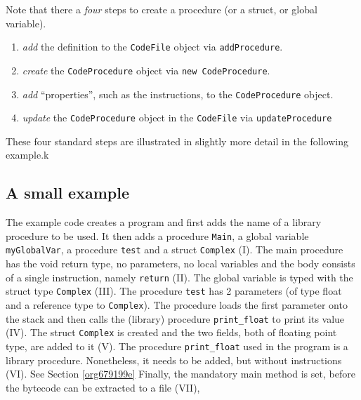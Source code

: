 \documentclass[11pt]{article}
\begin{document}
Note that there a \emph{four} steps to create a procedure (or a struct, or
global variable).

\begin{enumerate}
\item \emph{add} the definition to the \texttt{CodeFile} object via \texttt{addProcedure}.
\item \emph{create} the \texttt{CodeProcedure} object via \texttt{new CodeProcedure}.
\item \emph{add} ``properties'', such as the instructions, to the \texttt{CodeProcedure}
object.
\item \emph{update} the \texttt{CodeProcedure} object in the \texttt{CodeFile} via
\texttt{updateProcedure}
\end{enumerate}


These four standard steps are illustrated in slightly more detail in the
following example.k

\subsection{A small example}
\label{sec:org9d0a306}

The example code creates a program and first adds the name of a library
procedure to be used.  It then adds a procedure \texttt{Main}, a global variable
\texttt{myGlobalVar}, a procedure \texttt{test} and a struct \texttt{Complex} (I). The main
procedure has the void return type, no parameters, no local variables and
the body consists of a single instruction, namely \texttt{return} (II). The global
variable is typed with the struct type \texttt{Complex} (III). The procedure
\texttt{test} has 2 parameters (of type float and a reference type to
\texttt{Complex}). The procedure loads the first parameter onto the stack and then
calls the (library) procedure \texttt{print\_float} to print its value (IV). The
struct \texttt{Complex} is created and the two fields, both of floating point
type, are added to it (V). The procedure \texttt{print\_float} used in the program
is a library procedure. Nonetheless, it needs to be added, but without
instructions (VI). See Section \ref{org679199e} Finally, the mandatory main
method is set, before the bytecode can be extracted to a file (VII),
\end{document}

